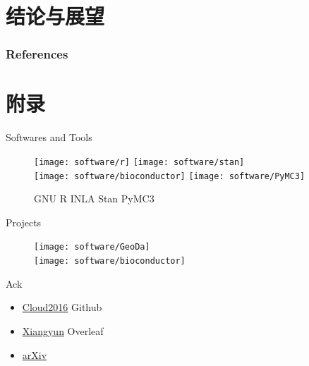 \documentclass[11pt,compress,xcolor=x11names,UTF8]{beamer}
\begin{document}
\section{结论与展望}

\begin{frame}

\end{frame}



\begin{frame}[allowframebreaks]
\frametitle{References}
\scriptsize


\end{frame}

\appendix

\section*{附录}

\begin{frame}{Softwares and Tools}
\begin{figure}

\centering
\texttt{[image: software/r]}\qquad
\texttt{[image: software/stan]} \\ 
\texttt{[image: software/bioconductor]}
\texttt{[image: software/PyMC3]} 
\caption{{\color{OrangeRed1} GNU R} {\color{SpringGreen4} INLA}  {\color{OrangeRed1} Stan} {\color{SpringGreen4} PyMC3}}

\end{figure}
\end{frame}



\begin{frame}{Projects}

\begin{figure}
\centering
\texttt{[image: software/GeoDa]}\\
\texttt{[image: software/bioconductor]}
\end{figure}

\end{frame}


\begin{frame}{Ack}
\begin{itemize}
\item[\faGithub] \href{https://github.com/Cloud2016}{Cloud2016} \faAt Github
\item[\aiOverleaf] \href{https://www.overleaf.com/}{Xiangyun} \faAt Overleaf
\item[\aiarXiv] \href{https://arxiv.org/}{arXiv}
\end{itemize}
\end{frame}
\end{document}
